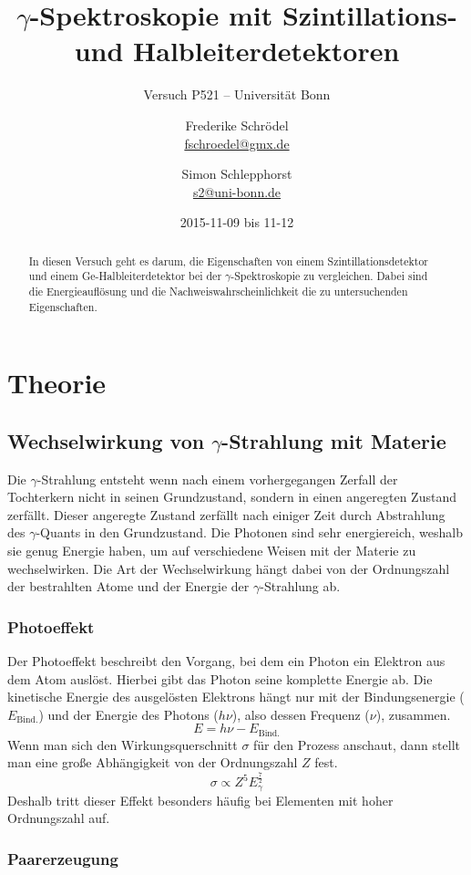\documentclass[11pt, ngerman, fleqn, DIV=15, headinclude, BCOR=2cm]{scrreprt}
\title{$\gamma$-Spektroskopie mit Szintillations- und Halbleiterdetektoren}
\subtitle{Versuch P521 -- Universität Bonn}
\author{
	Frederike Schrödel \\
	\small{\href{mailto:fschroedel@gmx.de}{fschroedel@gmx.de}}
	\and
	Simon Schlepphorst \\
	\small{\href{mailto:s2@uni-bonn.de}{s2@uni-bonn.de}}
}
\date{2015-11-09 bis 11-12}
\begin{document}
\maketitle

\begin{abstract}
    In diesen Versuch geht es darum, die Eigenschaften von einem
    Szintillationsdetektor und einem Ge-Halbleiterdetektor bei der
    $\gamma$-Spektroskopie zu vergleichen.
    Dabei sind die Energieauflösung und die Nachweiswahrscheinlichkeit die
    zu untersuchenden Eigenschaften.
\end{abstract}


\tableofcontents

\chapter{Theorie}

\section{Wechselwirkung von $\gamma$-Strahlung mit Materie}
Die $\gamma$-Strahlung entsteht wenn nach einem vorhergegangen Zerfall der
Tochterkern nicht in seinen Grundzustand, sondern in einen angeregten Zustand
zerfällt.
Dieser angeregte Zustand zerfällt nach einiger Zeit durch Abstrahlung des
$\gamma$-Quants in den Grundzustand. Die Photonen sind sehr energiereich,
weshalb sie genug Energie haben, um auf verschiedene Weisen mit der Materie zu
wechselwirken.
Die Art der Wechselwirkung hängt dabei von der Ordnungszahl der bestrahlten Atome
und der Energie der $\gamma$-Strahlung ab.

\subsection{Photoeffekt}
Der Photoeffekt beschreibt den Vorgang, bei dem ein Photon ein Elektron aus
dem Atom auslöst.
Hierbei gibt das Photon seine komplette Energie ab.
Die kinetische Energie des ausgelösten Elektrons hängt nur mit der
Bindungsenergie ($E_\text{Bind.}$) und der Energie des Photons ($h\nu$),
also dessen Frequenz ($\nu$), zusammen.
\[ 
    E = h\nu - E_\text{Bind.}
\]
Wenn man sich den Wirkungsquerschnitt $\sigma$ für den Prozess anschaut,
dann stellt man eine große Abhängigkeit von der Ordnungszahl $Z$ fest.
\[
    \sigma \propto Z^5 E_\gamma^{\frac 72}
\]
Deshalb tritt dieser Effekt besonders häufig bei Elementen mit hoher Ordnungszahl
auf.

\subsection{Paarerzeugung}
\end{document}
